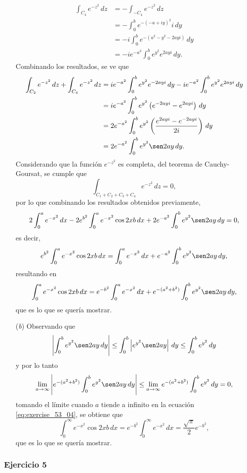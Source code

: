 \documentclass[a4paper]{report}
\begin{document}
\begin{enumerate}
\begin{align*}
   \int_{C_4}e^{-z^2}\,dz&=-\int_{-C_4}e^{-z^2}\,dz\\
    &=-\int_0^b e^{-(-a+iy)^2}i\,dy\\
    &=-i\int_0^b e^{-(a^2-y^2-2ayi)}\,dy\\
    &=-ie^{-a^2}\int_0^b e^{y^2}e^{2ayi}\,dy.
 \end{align*}
 Combinando los resultados, se ve que
 \begin{align*}
  \int_{C_2}e^{-z^2}\,dz+\int_{C_4}e^{-z^2}\,dz&=ie^{-a^2}\int_0^b e^{y^2}e^{-2ayi}\,dy-ie^{-a^2}\int_0^b e^{y^2}e^{2ayi}\,dy\\
   &=ie^{-a^2}\int_0^b e^{y^2}\left(e^{-2ayi}-e^{2ayi}\right)\,dy\\
   &=2e^{-a^2}\int_0^b e^{y^2}\left(\frac{e^{2ayi}-e^{-2ayi}}{2i}\right)\,dy\\
   &=2e^{-a^2}\int_0^b e^{y^2}\sen2ay\,dy.
 \end{align*}
 Considerando que la función \(e^{-z^2}\) es completa, del teorema de Cauchy-Goursat, se cumple que 
 \[
  \int_{C_1+C_2+C_3+C_4}e^{-z^2}\,dz=0,
 \]
 por lo que combinando los resultados obtenidos previamente,
 \[
  2\int_0^ae^{-x^2}\,dx-2e^{b^2}\int_0^a e^{-x^2}\cos 2xb\,dx+2e^{-a^2}\int_0^b e^{y^2}\sen2ay\,dy=0,
 \]
 es decir,
 \[
  e^{b^2}\int_0^a e^{-x^2}\cos 2xb\,dx=\int_0^ae^{-x^2}\,dx+e^{-a^2}\int_0^b e^{y^2}\sen2ay\,dy,
 \]
 resultando en 
 \begin{equation}\label{eq:exercise_53_04}
  \int_0^a e^{-x^2}\cos 2xb\,dx=e^{-b^2}\int_0^ae^{-x^2}\,dx+e^{-(a^2+b^2)}\int_0^b e^{y^2}\sen2ay\,dy,  
 \end{equation}
 que es lo que se quería mostrar.
 \item[(\textit{b})] Observando que 
 \[
  \left|\int_0^b e^{y^2}\sen2ay\,dy\right|\leq\int_0^b\left|e^{y^2}\sen2ay\right|\,dy\leq\int_0^b e^{y^2}\,dy
 \]
 y por lo tanto 
 \[
  \lim_{a\to\infty}\left|e^{-(a^2+b^2)}\int_0^b e^{y^2}\sen2ay\,dy\right|\leq\lim_{a\to\infty}e^{-(a^2+b^2)}\int_0^b e^{y^2}\,dy=0,
 \]
 tomando el límite cuando \(a\) tiende a infinito en la ecuación \ref{eq:exercise_53_04}, se obtiene que 
 \[
  \int_0^\infty e^{-x^2}\cos 2xb\,dx=e^{-b^2}\int_0^\infty e^{-x^2}\,dx=\frac{\sqrt{\pi}}{2}e^{-b^2},
 \]
 que es lo que se quería mostrar.
\end{enumerate}

\subsubsection*{Ejercicio 5}
\end{document}
